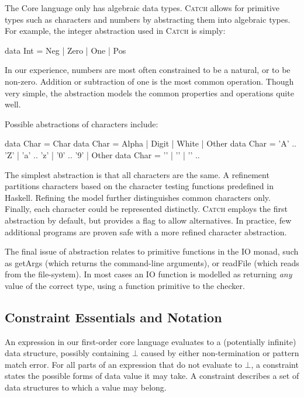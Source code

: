 \documentclass[preprint]{sigplanconf}
\newcommand{\C}[1]{\textsf{#1}}
\newcommand{\catch}{\textsc{Catch}}
\newenvironment{discuss}
    {\noindent\hspace{-1.5mm}\vline\hspace{1mm}\vline\hspace{1mm}\begin{minipage}[h]{\linewidth}}
    {\end{minipage}}
\begin{document}
The Core language only has algebraic data types. \catch{} allows for primitive types such as characters and numbers by abstracting them into algebraic types. For example, the integer abstraction used in \catch{} is simply:

\begin{code}
data Int = Neg | Zero | One | Pos
\end{code}

In our experience, numbers are most often constrained to be a natural, or to be non-zero. Addition or subtraction of one is the most common operation. Though very simple, the abstraction models the common properties and operations quite well.

Possible abstractions of characters include:

\begin{code}
data Char = Char
data Char = Alpha | Digit | White | Other
data Char = 'A' .. 'Z' | 'a' .. 'z' | '0' .. '9' | Other
data Char = '\0' | '\1' | '\2' ..
\end{code}

\noindent The simplest abstraction is that all characters are the same. A refinement partitions characters based on the character testing functions predefined in Haskell. Refining the model further distinguishes common characters only. Finally, each character could be represented distinctly. \catch{} employs the first abstraction by default, but provides a flag to allow alternatives. In practice, few additional programs are proven safe with a more refined character abstraction.

The final issue of abstraction relates to primitive functions in the \C{IO} monad, such as \C{getArgs} (which returns the command-line arguments), or \C{readFile} (which reads from the file-system). In most cases an IO function is modelled as returning \textit{any} value of the correct type, using a function primitive to the checker.


\subsection{Constraint Essentials and Notation}
\label{sec:constraints}

\begin{discuss}
An expression in our first-order core language evaluates to a (potentially infinite) data structure, possibly containing $\bot{}$ caused by either non-termination or pattern match error. For all parts of an expression that do not evaluate to $\bot{}$, a constraint states the possible forms of data value it may take. A constraint describes a set of data structures to which a value may belong.
\end{discuss}
\end{document}

